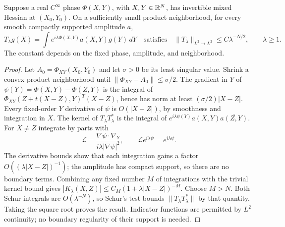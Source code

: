 \begin{lemma}\label{lem:oscillatory}
Suppose a real $C^\infty$ phase $\Phi(X,Y)$, with $X,Y\in\mathbb R^N$, has
invertible mixed Hessian at $(X_0,Y_0)$. On a sufficiently small product
neighborhood, for every smooth compactly supported amplitude $a$,
\[
 T_\lambda g(X)=\int e^{i\lambda\Phi(X,Y)}a(X,Y)g(Y)\,dY
 \quad\text{satisfies}\quad
 \|T_\lambda\|_{L^2\to L^2}\le C\lambda^{-N/2},\qquad\lambda\ge1.
\]
The constant depends on the fixed phase, amplitude, and neighborhood.
\end{lemma}
\begin{proof}
Let $A_0=\Phi_{XY}(X_0,Y_0)$ and let $\sigma>0$ be its least singular
value. Shrink a convex product neighborhood until
$\|\Phi_{XY}-A_0\|\le\sigma/2$. The gradient in $Y$ of
$\psi(Y)=\Phi(X,Y)-\Phi(Z,Y)$ is the integral of
$\Phi_{XY}(Z+t(X-Z),Y)^T(X-Z)$, hence has norm at least
$(\sigma/2)|X-Z|$. Every fixed-order $Y$ derivative of $\psi$ is
$O(|X-Z|)$, by smoothness and integration in $X$.
The kernel of $T_\lambda T_\lambda^*$ is the integral of
$e^{i\lambda\psi(Y)}a(X,Y)\overline{a(Z,Y)}$. For $X\ne Z$ integrate
by parts with
\[
 \mathcal L=\frac{\nabla\psi\cdot\nabla_Y}
                  {i\lambda|\nabla\psi|^2},
 \qquad \mathcal L e^{i\lambda\psi}=e^{i\lambda\psi}.
\]
The derivative bounds show that each integration gains a factor
$O((\lambda|X-Z|)^{-1})$; the amplitude has compact support, so there
are no boundary terms. Combining any fixed number $M$ of integrations
with the trivial kernel bound gives
$|K_\lambda(X,Z)|\le C_M(1+\lambda|X-Z|)^{-M}$.
Choose $M>N$. Both Schur integrals are $O(\lambda^{-N})$, so Schur's
test bounds $\|T_\lambda T_\lambda^*\|$ by that quantity. Taking the
square root proves the result. Indicator functions are permitted by
$L^2$ continuity; no boundary regularity of their support is needed.
\end{proof}

